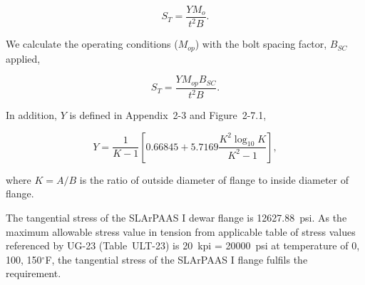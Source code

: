 \begin{equation}
    S_T = \frac{YM_o}{t^2B}.
\end{equation}


We calculate the operating conditions ($M_{op}$) with the bolt spacing 
factor, $B_{SC}$ applied,

\begin{equation}
    S_T = \frac{YM_{op}B_{SC}}{t^2B}.
\end{equation}

In addition, $Y$ is defined in Appendix~2-3 and Figure~2-7.1,

\begin{equation}
    Y = \frac{1}{K-1}[0.66845+5.7169\frac{K^2\log_{10}K}{K^2-1}],
\end{equation}

where $K = A/B$ is the ratio of outside diameter of flange to 
inside diameter of flange.

The tangential stress of the SLArPAAS I dewar flange is 12627.88~psi.
As the maximum allowable stress value in tension from applicable table
of stress values referenced by UG-23 (Table~ULT-23)
is 20~kpi = 20000~psi at temperature of 0, 100, 150$^{\circ}$F,
the tangential stress of the SLArPAAS I flange fulfils the requirement.
